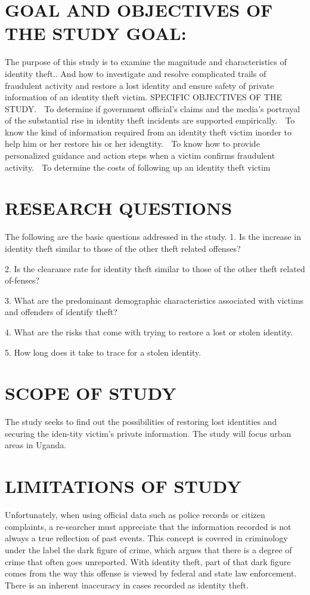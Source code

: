 \documentclass[10pt,letterpaper]{article}
\begin{document}
\section{GOAL AND OBJECTIVES OF THE STUDY GOAL:}
 The purpose of this study is to examine the magnitude and characteristics of identity theft..
And how to investigate and resolve complicated trails of fraudulent activity  and restore a lost identity and ensure safety of private information of an identity theft victim.
SPECIFIC OBJECTIVES OF THE STUDY. 
	To determine if government official’s claims and the media’s portrayal of the substantial rise in identity theft incidents are supported empirically.
	To know the kind of information  required from an identity theft victim inorder to help him or her restore his or her idengtity.
	To know how to provide personalized guidance and action steps when a victim confirms fraudulent activity.
	To determine the costs of following  up an identity theft victim

\section{RESEARCH QUESTIONS }
The following are the basic questions addressed in  the study.
1.	Is the increase in identity theft similar to those of the other theft related offenses?

2.	Is the clearance rate for identity theft similar to those of the other theft related of-fenses?

3.	What are the predominant demographic characteristics associated with victims and offenders of identify theft?

4.	What are the risks that come with trying to restore a lost or stolen identity.


5.	How long does it take to trace for a stolen identity.

\section{SCOPE OF STUDY}
The study seeks to  find out the possibilities of restoring lost identities and securing the iden-tity victim’s private information. The study will focus  urban areas in Uganda.

\section{LIMITATIONS OF STUDY}
 Unfortunately, when using official data such as police records or citizen complaints, a re-searcher must appreciate that the information recorded is not always a true reflection of past events. This concept is covered in criminology under the label the dark figure of crime, which argues that there is a degree of crime that often goes unreported. With identity theft, part of that dark figure comes from the way this offense is viewed by federal and state law enforcement. There is an inherent inaccuracy in cases recorded as identity theft.
\end{document}
